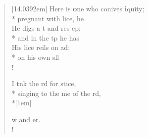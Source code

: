 \begin{flushleft}
\begin{verse}[14.0392em]
 Here is \textbf{o}ne who conives \textbf{i}quity;\\*
pregnant with lice, he    \\
 He digs a t and res  ep;\\*
and in the tp he has   \\
 His lice reils on  ad;\\*
on his own sll   \\!

 I tnk the rd for  stice,\\*
singing to the me of the rd,   \\*[1em]

w and  er. \\!
\end{verse}
\end{flushleft}
